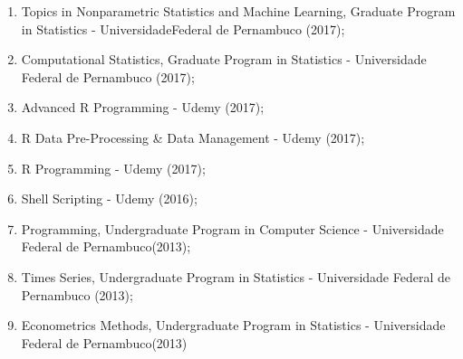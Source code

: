 \documentclass[11pt, a4paper]{awesome-cv}
\begin{document}
\begin{itemize}
\begin{enumerate}
  \item
    Topics in Nonparametric Statistics and Machine Learning, Graduate Program in Statistics - UniversidadeFederal de Pernambuco (2017);
  \item
    Computational Statistics, Graduate Program in Statistics - Universidade Federal de Pernambuco (2017);
  \item
    Advanced R Programming - Udemy (2017);
  \item
    R Data Pre-Processing \& Data Management - Udemy (2017);
  \item
    R Programming - Udemy (2017);
  \item
    Shell Scripting - Udemy (2016);
  \item
    Programming, Undergraduate Program in Computer Science - Universidade Federal de Pernambuco(2013);
  \item
    Times Series, Undergraduate Program in Statistics - Universidade Federal de Pernambuco (2013);
  \item
    Econometrics Methods, Undergraduate Program in Statistics - Universidade Federal de Pernambuco(2013)
  \end{enumerate}
\end{itemize}
\end{document}

